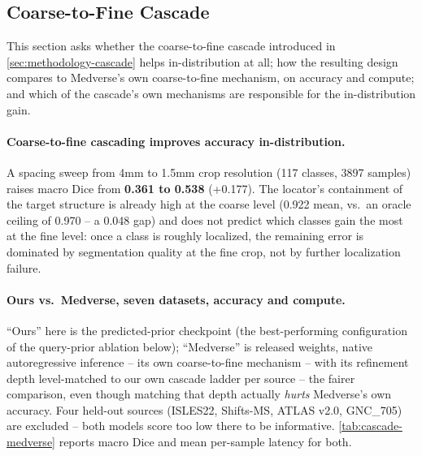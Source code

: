 \subsection{Coarse-to-Fine Cascade}\label{sec:results-cascade}

This section asks whether the coarse-to-fine cascade introduced in
\autoref{sec:methodology-cascade} helps in-distribution at all; how the
resulting design compares to Medverse's own coarse-to-fine mechanism, on
accuracy and compute; and which of the cascade's own mechanisms are
responsible for the in-distribution gain.

\paragraph{Coarse-to-fine cascading improves accuracy in-distribution.}
A spacing sweep from 4mm to 1.5mm crop resolution (117 classes, 3897
samples) raises macro Dice from \textbf{0.361 to 0.538} (+0.177). The
locator's containment of the target structure is already high at the
coarse level (0.922 mean, vs.\ an oracle ceiling of 0.970 -- a 0.048 gap)
and does not predict which classes gain the most at the fine level: once
a class is roughly localized, the remaining error is dominated by
segmentation quality at the fine crop, not by further localization
failure.

\paragraph{Ours vs.\ Medverse, seven datasets, accuracy and compute.}
``Ours'' here is the predicted-prior checkpoint (the best-performing
configuration of the query-prior ablation below); ``Medverse'' is
released weights, native autoregressive inference -- its own
coarse-to-fine mechanism -- with its refinement depth level-matched to
our own cascade ladder per source -- the fairer comparison, even though
matching that depth actually \emph{hurts} Medverse's own accuracy. Four
held-out sources (ISLES22, Shifts-MS, ATLAS v2.0, GNC\_705) are excluded
-- both models score too low there to be informative.
\autoref{tab:cascade-medverse} reports macro Dice and mean per-sample
latency for both. 

